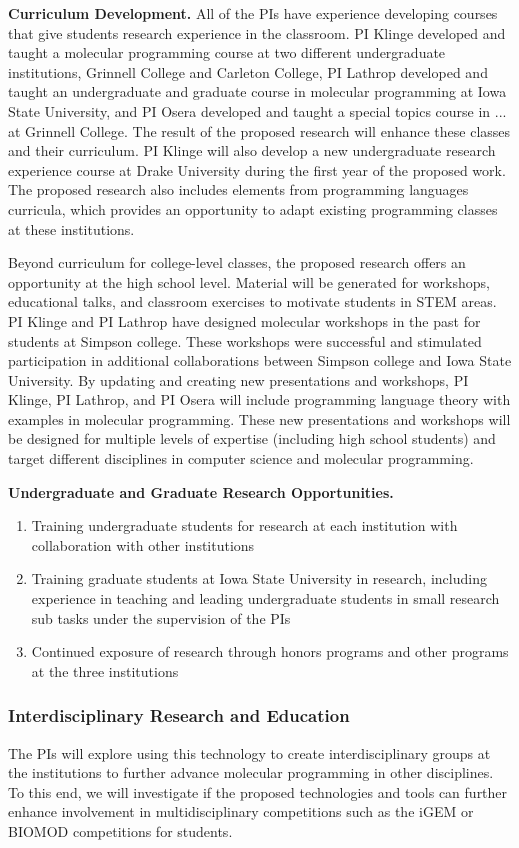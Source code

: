 \textbf{Curriculum Development.}
All of the PIs have experience developing courses that give students research experience in the classroom.
PI Klinge developed and taught a molecular programming course at two different undergraduate institutions, Grinnell College and Carleton College, PI Lathrop developed and taught an undergraduate and graduate course in molecular programming at Iowa State University, and PI Osera developed and taught a special topics course in ... at Grinnell College.
The result of the proposed research will enhance these classes and their curriculum.
PI Klinge will also develop a new undergraduate research experience course at Drake University during the first year of the proposed work.
The proposed research also includes elements from programming languages curricula, which provides an opportunity to adapt existing programming classes at these institutions.

Beyond curriculum for college-level classes, the proposed research offers an opportunity at the high school level.
Material will be generated for workshops, educational talks, and classroom exercises to  motivate students in STEM areas.
PI Klinge and PI Lathrop have designed molecular workshops in the past for students at Simpson college.
These workshops were successful and stimulated participation in additional collaborations between Simpson college and Iowa State University.
By updating and creating new presentations and workshops, PI Klinge, PI Lathrop, and PI Osera will include programming language theory with examples in molecular programming.
These new presentations and workshops will be designed for multiple levels of expertise (including high school students) and target different disciplines in computer science and molecular programming.


\textbf{Undergraduate and Graduate Research Opportunities.}
\begin{enumerate}
	\item Training undergraduate students for research at each institution with collaboration with other institutions
	\item Training graduate students at Iowa State University in research, including experience in teaching and leading undergraduate students in small research sub tasks under the supervision of the PIs
	\item Continued exposure of research through honors programs and other programs at the three institutions
\end{enumerate}

\subsubsection*{Interdisciplinary Research and Education}
The PIs will explore using this technology to create interdisciplinary groups at the institutions to further advance molecular programming in other disciplines.  To this end, we will investigate if the proposed technologies and tools can further enhance involvement in multidisciplinary competitions such as the iGEM or BIOMOD competitions for students.

